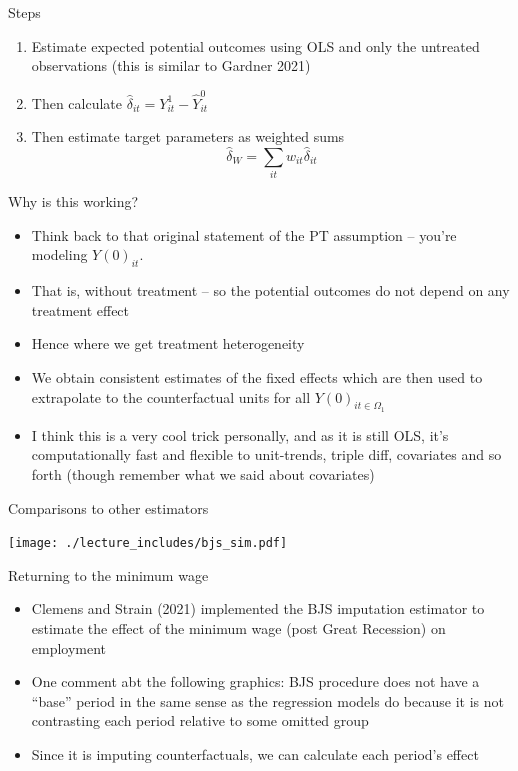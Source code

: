 \documentclass{beamer}
\begin{document}
\begin{frame}{Steps}

\begin{enumerate}
\item Estimate expected potential outcomes using OLS and only the untreated observations (this is similar to Gardner 2021)
\item Then calculate $\widehat{\delta}_{it} = Y_{it}^1 - \widehat{Y}_{it}^0$
\item Then estimate target parameters as weighted sums$$\widehat{\delta}_W = \sum_{it}w_{it}\widehat{\delta}_{it}$$
\end{enumerate}

\end{frame}


\begin{frame}{Why is this working?}

\begin{itemize}
\item Think back to that original statement of the PT assumption -- you're modeling $Y(0)_{it}$. 
\item That is, without treatment -- so the potential outcomes do not depend on any treatment effect
\item Hence where we get treatment heterogeneity
\item We obtain consistent estimates of the fixed effects which are then used to extrapolate to the counterfactual units for all $Y(0)_{it \in \Omega_1}$
\item I think this is a very cool trick personally, and as it is still OLS, it's computationally fast and flexible to unit-trends, triple diff, covariates and so forth (though remember what we said about covariates)
\end{itemize}

\end{frame}


\begin{frame}{Comparisons to other estimators}

\begin{center}
\texttt{[image: ./lecture\_includes/bjs\_sim.pdf]}
\end{center}

\end{frame}

\begin{frame}{Returning to the minimum wage}

\begin{itemize}
\item Clemens and Strain (2021) implemented the BJS imputation estimator to estimate the effect of the minimum wage (post Great Recession) on employment
\item One comment abt the following graphics: BJS procedure does not have a ``base'' period in the same sense as the regression models do because it is not contrasting each period relative to some omitted group
\item Since it is imputing counterfactuals, we can calculate each period's effect
\end{itemize}

\end{frame}
\end{document}
